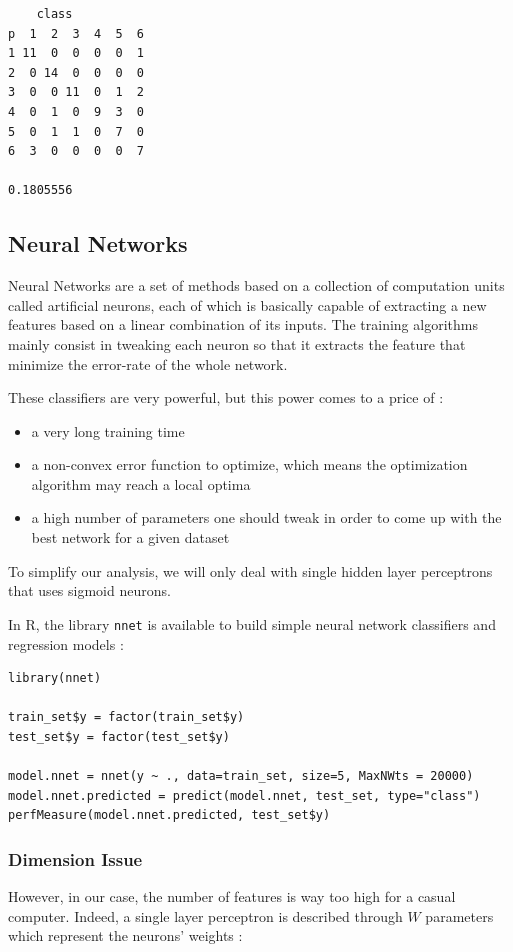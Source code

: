 \documentclass[]{report}
\begin{document}
\begin{verbatim}
    class
p  1  2  3  4  5  6
1 11  0  0  0  0  1
2  0 14  0  0  0  0
3  0  0 11  0  1  2
4  0  1  0  9  3  0
5  0  1  1  0  7  0
6  3  0  0  0  0  7

0.1805556
\end{verbatim}

\pagebreak

\subsection{Neural Networks}

Neural Networks are a set of methods based on a collection of computation units called artificial neurons, each of which is basically capable of extracting a new features based on a linear combination of its inputs. The training algorithms mainly consist in tweaking each neuron so that it extracts the feature that minimize the error-rate of the whole network.

These classifiers are very powerful, but this power comes to a price of : 
\begin{itemize}
	\item a very long training time
	\item a non-convex error function to optimize, which means the optimization algorithm may reach a local optima
	\item a high number of parameters one should tweak in order to come up with the best network for a given dataset
\end{itemize}
To simplify our analysis, we will only deal with single hidden layer perceptrons that uses sigmoid neurons. 

In R, the library \texttt{nnet} is available to build simple neural network classifiers and regression models : 
\begin{lstlisting}
library(nnet)

train_set$y = factor(train_set$y)
test_set$y = factor(test_set$y)

model.nnet = nnet(y ~ ., data=train_set, size=5, MaxNWts = 20000)
model.nnet.predicted = predict(model.nnet, test_set, type="class")
perfMeasure(model.nnet.predicted, test_set$y)
\end{lstlisting}

\subsubsection{Dimension Issue}

However, in our case, the number of features is way too high for a casual computer. Indeed, a single layer perceptron is described through $W$ parameters which represent the neurons' weights : 
\end{document}
